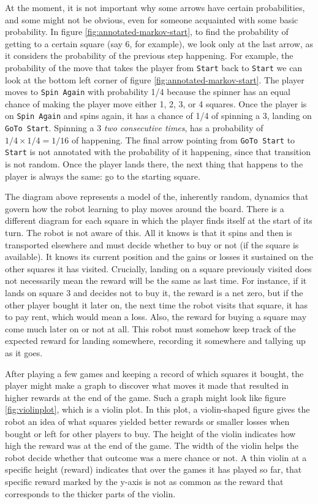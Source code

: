 At the moment, it is not important why some arrows have certain probabilities,
and some might not be obvious, even for someone acquainted with some basic
probability. In figure \ref{fig:annotated-markov-start}, to find the probability
of getting to a certain square (say 6, for example), we look only at the last
arrow, as it considers the probability of the previous step happening. For
example, the probability of the move that takes the player from \texttt{Start}
back to \texttt{Start} we can look at the bottom left corner of figure
\ref{fig:annotated-markov-start}. The player moves to \texttt{Spin Again} with
probability 1/4 because the spinner has an equal chance of making the player
move either 1, 2, 3, or 4 squares. Once the player is on \texttt{Spin Again} and
spins again, it has a chance of 1/4 of spinning a 3, landing on \texttt{GoTo
Start}. Spinning a 3 \textit{two consecutive times}, has a probability of $1/4
\times 1/4 = 1/16$ of happening. The final arrow pointing from \texttt{GoTo
Start} to \texttt{Start} is not annotated with the probability of it happening,
since that transition is not random. Once the player lands there, the next thing
that happens to the player is always the same: go to the starting square.

The diagram above represents a model of the, inherently random, dynamics that
govern how the robot learning to play moves around the board. There is a
different diagram for each square in which the player finds itself at the start
of its turn. The robot is not aware of this. All it knows is that it spins and
then is transported elsewhere and must decide whether to buy or not (if the
square is available). It knows its current position and the gains or losses it
sustained on the other squares it has visited. Crucially, landing on a square
previously visited does not necessarily mean the reward will be the same as last
time. For instance, if it lands on square 3 and decides not to buy it, the
reward is a net zero, but if the other player bought it later on, the next time
the robot visits that square, it has to pay rent, which would mean a loss. Also,
the reward for buying a square may come much later on or not at all. This robot
must somehow keep track of the expected reward for landing somewhere, recording
it somewhere and tallying up as it goes.

After playing a few games and keeping a record of which squares it bought, the
player might make a graph to discover what moves it made that resulted in higher
rewards at the end of the game. Such a graph might look like figure
\ref{fig:violinplot}, which is a violin plot. In this plot, a violin-shaped
figure gives the robot an idea of what squares yielded better rewards or smaller
losses when bought or left for other players to buy. The height of the violin
indicates how high the reward was at the end of the game. The width of the
violin helps the robot decide whether that outcome was a mere chance or not.  A
thin violin at a specific height (reward) indicates that over the games it has
played so far, that specific reward marked by the y-axis is not as common as
the reward that corresponds to the thicker parts of the violin.

